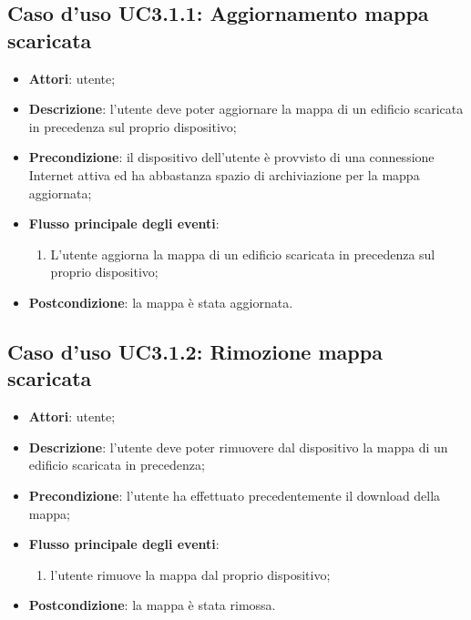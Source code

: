 \documentclass[../AnalisiDeiRequisiti.tex]{subfiles}
\begin{document}
\subsection{Caso d'uso UC3.1.1: Aggiornamento mappa scaricata}
\begin{itemize}
\item \textbf{Attori}: utente;

\item \textbf{Descrizione}: l'utente deve poter aggiornare la mappa di un edificio scaricata in precedenza sul proprio dispositivo; 
      \item \textbf{Precondizione}: il dispositivo dell'utente è provvisto di una connessione Internet attiva ed ha abbastanza spazio di archiviazione per la mappa aggiornata;
      \item \textbf{Flusso principale degli eventi}:
          \begin{enumerate}
          \item L'utente aggiorna la mappa di un edificio scaricata in precedenza sul proprio dispositivo;
      \end{enumerate}
    \item \textbf{Postcondizione}: la mappa è stata aggiornata.
  \end{itemize}
\hypertarget{UC3.1.2}{}
\subsection{Caso d'uso UC3.1.2: Rimozione mappa scaricata}

\begin{itemize}
\item \textbf{Attori}: utente;
\item \textbf{Descrizione}: l'utente deve poter rimuovere dal dispositivo la mappa di un edificio scaricata in precedenza; 
      \item \textbf{Precondizione}: l'utente ha effettuato precedentemente il download della mappa;

        \item \textbf{Flusso principale degli eventi}:
          \begin{enumerate}
          \item l'utente rimuove la mappa dal proprio dispositivo;

      \end{enumerate}
    \item \textbf{Postcondizione}: la mappa è stata rimossa.
  \end{itemize}
\hypertarget{UC3.1.3}{}
\end{document}
